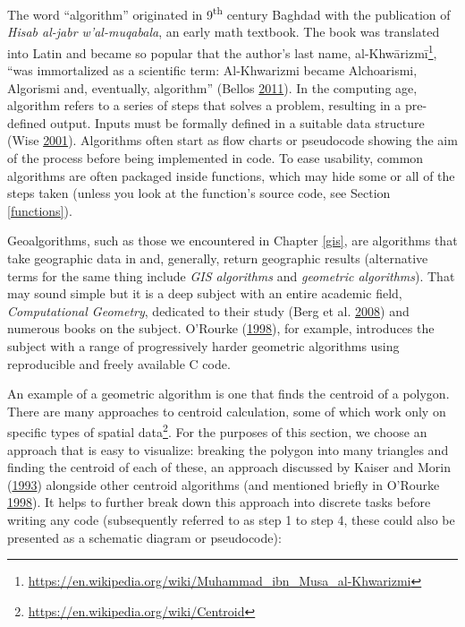 \documentclass[]{krantz}
\let\rmarkdownfootnote\footnote%
\def\footnote{\protect\rmarkdownfootnote}
\renewcommand{\href}[2]{#2\footnote{\url{#1}}}
\begin{document}
The word ``algorithm'' originated in 9\textsuperscript{th} century Baghdad with the publication of \emph{Hisab al-jabr w'al-muqabala}, an early math textbook.
The book was translated into Latin and became so popular that the author's last name, \href{https://en.wikipedia.org/wiki/Muhammad_ibn_Musa_al-Khwarizmi}{al-Khwārizmī}, ``was immortalized as a scientific term: Al-Khwarizmi
became Alchoarismi, Algorismi and, eventually, algorithm'' (Bellos \protect\hyperlink{ref-bellos_alex_2011}{2011}).
In the computing age, algorithm refers to a series of steps that solves a problem, resulting in a pre-defined output.
Inputs must be formally defined in a suitable data structure (Wise \protect\hyperlink{ref-wise_gis_2001}{2001}).
Algorithms often start as flow charts or pseudocode showing the aim of the process before being implemented in code.
To ease usability, common algorithms are often packaged inside functions, which may hide some or all of the steps taken (unless you look at the function's source code, see Section \ref{functions}).

Geoalgorithms, such as those we encountered in Chapter \ref{gis}, are algorithms that take geographic data in and, generally, return geographic results (alternative terms for the same thing include \emph{GIS algorithms} and \emph{geometric algorithms}).
That may sound simple but it is a deep subject with an entire academic field, \emph{Computational Geometry}, dedicated to their study (Berg et al. \protect\hyperlink{ref-berg_computational_2008}{2008}) and numerous books on the subject.
O'Rourke (\protect\hyperlink{ref-orourke_computational_1998}{1998}), for example, introduces the subject with a range of progressively harder geometric algorithms using reproducible and freely available C code.

An example of a geometric algorithm is one that finds the centroid of a polygon.
There are many approaches to centroid calculation, some of which work only on specific types of \href{https://en.wikipedia.org/wiki/Centroid}{spatial data}.
For the purposes of this section, we choose an approach that is easy to visualize: breaking the polygon into many triangles and finding the centroid of each of these, an approach discussed by Kaiser and Morin (\protect\hyperlink{ref-kaiser_algorithms_1993}{1993}) alongside other centroid algorithms (and mentioned briefly in O'Rourke \protect\hyperlink{ref-orourke_computational_1998}{1998}).
It helps to further break down this approach into discrete tasks before writing any code (subsequently referred to as step 1 to step 4, these could also be presented as a schematic diagram or pseudocode):
\end{document}
